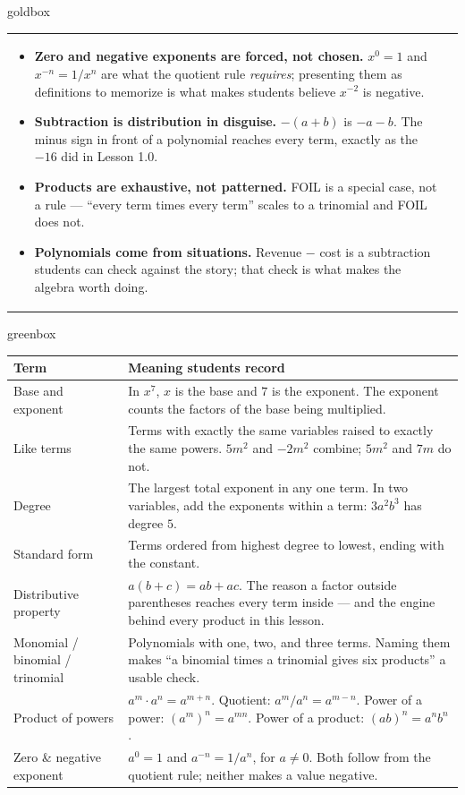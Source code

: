 \documentclass[10pt]{article}
\begin{document}
\begin{skillbox}{goldbox}
\begin{tabularx}{\linewidth}{@{}X|X@{}}
\begin{minipage}[t]{\linewidth}
\begin{itemize}[leftmargin=1.1em, itemsep=2pt, topsep=2pt]
  \item \textbf{Zero and negative exponents are forced, not chosen.} $x^0=1$ and $x^{-n}=1/x^n$ are
        what the quotient rule \emph{requires}; presenting them as definitions to memorize is what
        makes students believe $x^{-2}$ is negative.
  \item \textbf{Subtraction is distribution in disguise.} $-(a+b)$ is $-a-b$. The minus sign in
        front of a polynomial reaches every term, exactly as the $-16$ did in Lesson 1.0.
  \item \textbf{Products are exhaustive, not patterned.} FOIL is a special case, not a rule ---
        ``every term times every term'' scales to a trinomial and FOIL does not.
  \item \textbf{Polynomials come from situations.} Revenue $-$ cost is a subtraction students can
        check against the story; that check is what makes the algebra worth doing.
\end{itemize}
\end{minipage}
\end{tabularx}
\end{skillbox}

\begin{skillbox}{greenbox}
\renewcommand{\arraystretch}{1.35}
\begin{tabularx}{\linewidth}{@{}p{3.6cm}X@{}}
\textbf{Term} & \textbf{Meaning students record} \\
\hline
Base and exponent & In $x^7$, $x$ is the base and $7$ is the exponent. The exponent counts the
    factors of the base being multiplied. \\
Like terms & Terms with exactly the same variables raised to exactly the same powers. $5m^2$ and
    $-2m^2$ combine; $5m^2$ and $7m$ do not. \\
Degree & The largest total exponent in any one term. In two variables, add the exponents within
    a term: $3a^2b^3$ has degree $5$. \\
Standard form & Terms ordered from highest degree to lowest, ending with the constant. \\
Distributive property & $a(b+c)=ab+ac$. The reason a factor outside parentheses reaches every
    term inside --- and the engine behind every product in this lesson. \\
Monomial / binomial / trinomial & Polynomials with one, two, and three terms. Naming them makes
    ``a binomial times a trinomial gives six products'' a usable check. \\
Product of powers & $a^m\cdot a^n=a^{m+n}$. Quotient: $a^m/a^n=a^{m-n}$. Power of a power:
    $(a^m)^n=a^{mn}$. Power of a product: $(ab)^n=a^nb^n$. \\
Zero \& negative exponent & $a^0=1$ and $a^{-n}=1/a^n$, for $a \ne 0$. Both follow from the
    quotient rule; neither makes a value negative. \\
\end{tabularx}
\end{skillbox}
\end{document}
